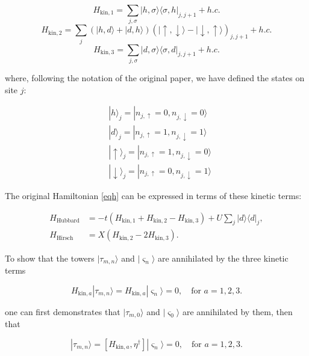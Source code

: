 \documentclass[11pt]{article}
\begin{document}
\begin{itemize}
\begin{itemize}
\begin{equation}
H_{\text{kin},1} = \sum_{j,\sigma} |h, \sigma\rangle \langle \sigma, h|_{j,j+1} + h.c.
\end{equation}
\begin{equation}
H_{\text{kin},2} = \sum_{j} \left(|h, d\rangle + |d, h\rangle \right) \left(|\uparrow, \downarrow\rangle - |\downarrow, \uparrow\rangle \right)_{j,j+1}  + h.c.
\end{equation}
\begin{equation}
H_{\text{kin},3} = \sum_{j,\sigma} |d, \sigma\rangle \langle \sigma, d|_{j,j+1} + h.c.
\end{equation}

where, following the notation of the original paper, we have defined the states on site $j$:

\begin{align}
& |h\rangle_j = |n_{j,\uparrow} = 0, n_{j,\downarrow} = 0\rangle \\
& |d\rangle_j = |n_{j,\uparrow} = 1, n_{j,\downarrow} = 1\rangle \\
& |\uparrow\rangle_j = |n_{j,\uparrow} = 1, n_{j,\downarrow} = 0\rangle \\
& |\downarrow\rangle_j = |n_{j,\uparrow} = 0, n_{j,\downarrow} = 1\rangle
\end{align}

The original Hamiltonian \eqref{eqh} can be expressed in terms of these kinetic terms:

\begin{align}
    H_{\text{Hubbard}} &= - t \left(H_{\text{kin},1} + H_{\text{kin},2} - H_{\text{kin},3}\right) + U \sum_j |d\rangle \langle d|_j, \\
    H_{\text{Hirsch}} &= X \left(H_{\text{kin},2} - 2 H_{\text{kin},3}\right).
    \end{align}
    
To show that the towers \( |\tau_{m,n}\rangle \) and \( |\varsigma_n\rangle \) are annihilated by the three kinetic terms

\begin{equation}
H_{\text{kin},a} |\tau_{m,n}\rangle = H_{\text{kin},a} |\varsigma_n\rangle = 0, \quad \text{for } a = 1,2,3.
\end{equation}

one can first demonstrates that \( |\tau_{m,0}\rangle \) and \( |\varsigma_0\rangle \) are annihilated by them, then that 

\begin{equation}
[H_{\text{kin},a}, \eta^\dag ] |\tau_{m,n}\rangle = [H_{\text{kin},a}, \eta^\dag ] |\varsigma_n\rangle = 0, \quad \text{for } a = 1,2,3.
\end{equation}





\end{itemize}
\end{itemize}
\end{document}
